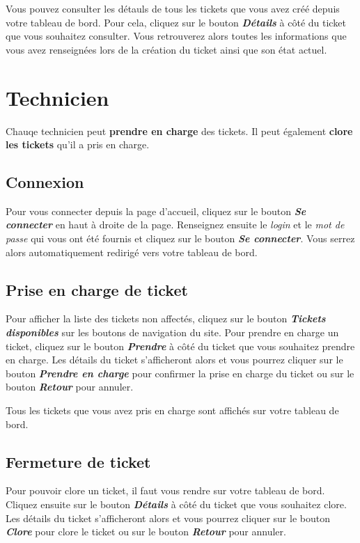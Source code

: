 \documentclass[12pt, a4paper]{article}
\begin{document}
Vous pouvez consulter les détauls de tous les tickets que vous avez créé depuis votre tableau de bord.
Pour cela, cliquez sur le bouton \textit{\textbf{Détails}} à côté du ticket que vous souhaitez consulter.
Vous retrouverez alors toutes les informations que vous avez renseignées lors de la création du ticket ainsi que son état actuel.

\section{Technicien}

Chauqe technicien peut \textbf{prendre en charge} des tickets. Il peut également \textbf{clore les tickets} qu'il a pris en charge.

\subsection*{Connexion}

Pour vous connecter depuis la page d'accueil, cliquez sur le bouton \textit{\textbf{Se connecter}} en haut à droite de la page.
Renseignez ensuite le \textit{login} et le \textit{mot de passe} qui vous ont été fournis et cliquez sur le bouton \textit{\textbf{Se connecter}}.
Vous serrez alors automatiquement redirigé vers votre tableau de bord.

\subsection*{Prise en charge de ticket}

Pour afficher la liste des tickets non affectés, cliquez sur le bouton \textit{\textbf{Tickets disponibles}} sur les boutons de navigation du site.
Pour prendre en charge un ticket, cliquez sur le bouton \textit{\textbf{Prendre}} à côté du ticket que vous souhaitez prendre en charge.
Les détails du ticket s'afficheront alors et vous pourrez cliquer sur le bouton \textit{\textbf{Prendre en charge}} pour confirmer la prise en charge du ticket ou sur le bouton \textit{\textbf{Retour}} pour annuler.

\bigskip
\noindent Tous les tickets que vous avez pris en charge sont affichés sur votre tableau de bord.

\subsection*{Fermeture de ticket}

Pour pouvoir clore un ticket, il faut vous rendre sur votre tableau de bord.
Cliquez ensuite sur le bouton \textit{\textbf{Détails}} à côté du ticket que vous souhaitez clore.
Les détails du ticket s'afficheront alors et vous pourrez cliquer sur le bouton \textit{\textbf{Clore}} pour clore le ticket ou sur le bouton \textit{\textbf{Retour}} pour annuler.
\end{document}
